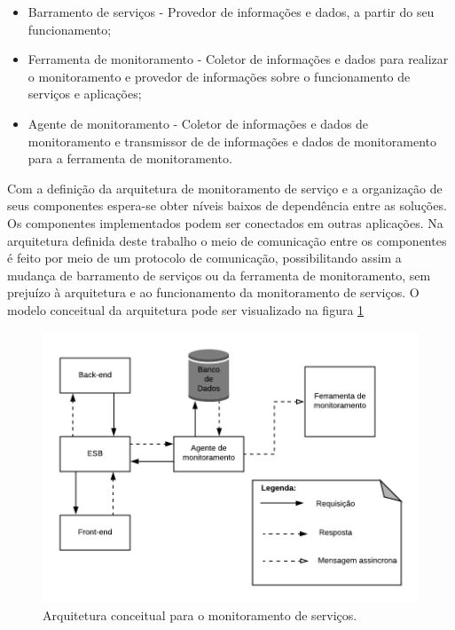 \begin{itemize}
    \item Barramento de serviços - Provedor de informações e dados, a partir do seu funcionamento; 
    \item Ferramenta de monitoramento - Coletor de informações e dados para realizar o monitoramento e provedor de informações sobre o funcionamento de serviços e aplicações; 
    \item Agente de monitoramento - Coletor de informações e dados de monitoramento e transmissor de de informações e dados de monitoramento para a ferramenta de monitoramento.
\end{itemize}

Com a definição da arquitetura de monitoramento de serviço e a organização de seus componentes espera-se obter níveis baixos de dependência entre as soluções. Os componentes implementados podem ser conectados em outras aplicações. Na arquitetura definida deste trabalho o meio de comunicação entre os componentes é feito por meio de um protocolo de comunicação, possibilitando assim a mudança de barramento de serviços ou da ferramenta de monitoramento, sem prejuízo à arquitetura e ao funcionamento da monitoramento de serviços. O modelo conceitual da arquitetura pode ser visualizado na figura \ref{fun:fig:arquitetura_conceitual_monitoramento}

\begin{figure}[h!]
	\begin{center}
	\includegraphics[scale = 0.55]{img/Arquitetura_Proposta_Monitoramento.png}
		\caption{Arquitetura conceitual para o monitoramento de serviços.}
		\label{fun:fig:arquitetura_conceitual_monitoramento}
	\end{center}
\end{figure}

